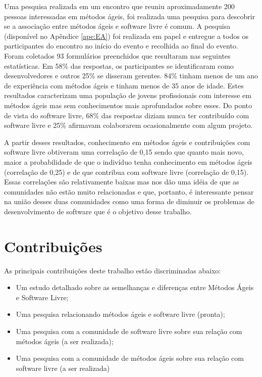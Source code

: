 Uma pesquisa realizada em um encontro que reuniu aproximadamente 200
pessoas interessadas em métodos ágeis, foi realizada uma pesquisa para
descobrir se a associação entre métodos ágeis e software livre é
comum. A pesquisa (disponível no Apêndice \ref{ape:EA}) foi realizada
em papel e entregue a todos os participantes do encontro no início do
evento e recolhida ao final do evento. Foram coletados 93 formulários
preenchidos que resultaram nas seguintes estatísticas. Em 58\% das
respostas, os participantes se identificaram como desenvolvedores e
outros 25\% se disseram gerentes. 84\% tinham menos de um ano de
experiência com métodos ágeis e tinham menos de 35 anos de
idade. Estes resultados caracterizam uma população de jovens
profissionais com interesse em métodos ágeis mas sem conhecimentos
mais aprofundados sobre esses. Do ponto de vista do software livre,
68\% das respostas diziam nunca ter contribuído com software livre e
25\% afirmavam colaborarem ocasionalmente com algum projeto.

A partir desses resultados, conhecimento em métodos ágeis e
contribuições com software livre obtiveram uma correlação de 0,15
sendo que quanto mais novo, maior a probabilidade de que o indivíduo
tenha conhecimento em métodos ágeis (correlação de 0,25) e de que
contribua com software livre (correlação de 0,15). Essas correlações
são relativamente baixas mas nos dão uma idéia de que as comunidades
não estão muito relacionadas e que, portanto, é interessante pensar na
união desses duas comunidades como uma forma de diminuir os problemas
de desenvolvimento de software que é o objetivo desse trabalho.

\section{Contribuições}
\label{sec:contribucoes}

As principais contribuições deste trabalho estão discriminadas abaixo:

\begin{itemize}
\item Um estudo detalhado sobre as semelhanças e diferenças entre
  Métodos Ágeis e Software Livre;
\item Uma pesquisa relacionando métodos ágeis e software livre
  (pronta);
\item Uma pesquisa com a comunidade de software livre sobre sua
  relação com métodos ágeis (a ser realizada);
\item Uma pesquisa com a comunidade de métodos ágeis sobre sua relação
  com software livre (a ser realizada)
\end{itemize}

